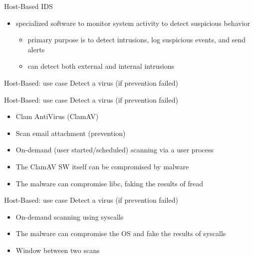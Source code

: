 \documentclass{beamer}
\begin{document}
\begin{frame}{Host-Based IDS}
  \begin{itemize}
  \item specialized software to monitor system activity to 
    detect suspicious behavior 
    \begin{itemize}
    \item primary purpose is to detect intrusions, log suspicious events, 
      and send alerts 
    \item can detect both external and internal intrusions 
    \end{itemize}
  \end{itemize}
\end{frame}

\begin{frame}[t]{Host-Based: use case}
  Detect a virus (if prevention failed)
\end{frame}

\begin{frame}[t]{Host-Based: use case}
  Detect a virus (if prevention failed)
  \\[20pt]
  \begin{itemize}
  \item Clam AntiVirus (ClamAV)
  \item Scan email attachment (prevention)
  \item On-demand (user started/scheduled) scanning via a user process
    \\[20pt]
  \item<2-> The ClamAV SW itself can be compromised by malware
  \item<3-> The malware can compromise libc, faking the results of fread
  \end{itemize}
\end{frame}

\begin{frame}[t]{Host-Based: use case}
  Detect a virus (if prevention failed)
  \\[20pt]
  \begin{itemize}
  \item On-demand scanning using syscalls
  \\[20pt]
  \item<2-> The malware can compromise the OS and fake the results of syscalls
  \item<3-> Window between two scans
  \end{itemize}
\end{frame}
\end{document}
